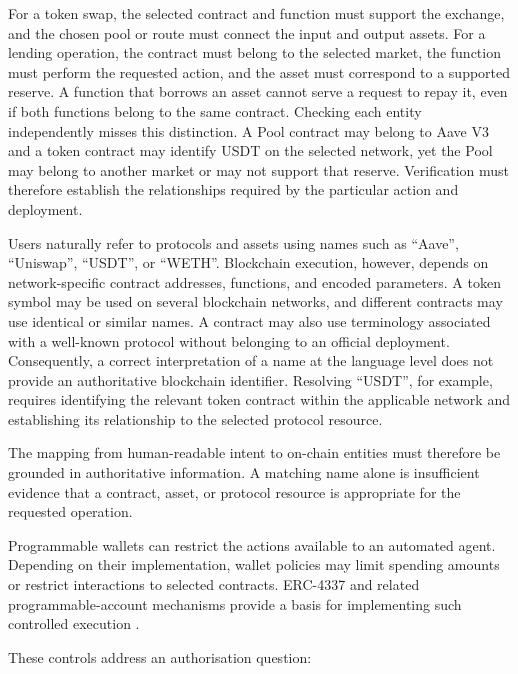 For a token swap, the selected contract and function must support the
exchange, and the chosen pool or route must connect the input and output
assets. For a lending operation, the contract must belong to the selected
market, the function must perform the requested action, and the asset must
correspond to a supported reserve. A function that borrows an asset cannot
serve a request to repay it, even if both functions belong to the same
contract. Checking each entity independently misses this distinction. A Pool contract
may belong to Aave V3 and a token contract may identify USDT on the
selected network, yet the Pool may belong to another market or may not
support that reserve. Verification must therefore establish the
relationships required by the particular action and deployment.

Users naturally refer to protocols and assets using names such as
``Aave'', ``Uniswap'', ``USDT'', or ``WETH''. Blockchain execution,
however, depends on network-specific contract addresses, functions,
and encoded parameters. A token symbol may be used on several
blockchain networks, and different contracts may use identical or
similar names. A contract may also use terminology associated with a
well-known protocol without belonging to an official deployment. Consequently, a correct interpretation of a name at the language level
does not provide an authoritative blockchain identifier. Resolving
``USDT'', for example, requires identifying the relevant token contract
within the applicable network and establishing its relationship to
the selected protocol resource.

The mapping from human-readable intent to on-chain entities must
therefore be grounded in authoritative information. A matching name
alone is insufficient evidence that a contract, asset, or protocol
resource is appropriate for the requested operation.


Programmable wallets can restrict the actions available to an automated
agent. Depending on their implementation, wallet policies may limit
spending amounts or restrict interactions to selected contracts.
ERC-4337 and related programmable-account mechanisms provide a basis
for implementing such controlled execution
\cite{buterinERC4337AccountAbstraction2021,
linMeasurementInvestigationERC43372024}.

These controls address an authorisation question:

